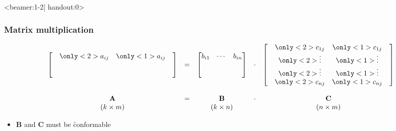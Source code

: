 \begin{frame}<beamer:1-2| handout:0>
  \frametitle{Matrix multiplication}

  \ungap
  \[
  \begin{array}{ccccc}
    \begin{bmatrix}
      & \only<2>{a_{ij}} & \only<1>{a_{ij}} & \\
      & & & \\
      & & &
    \end{bmatrix}
    & = &
    \begin{bmatrix}
      b_{i1} & \cdots & b_{in} \\
      & &  \\
      & &  
    \end{bmatrix}
    & \cdot &
    \begin{bmatrix}
      & \only<2>{c_{1j}} & \only<1>{c_{1j}} &\\
      & \only<2>{\vdots} & \only<1>{\vdots} & \\
      & \only<2>{\vdots} & \only<1>{\vdots} & \\
      & \only<2>{c_{nj}} & \only<1>{c_{nj}} & 
    \end{bmatrix} \\
    \\
    \mathbf{A} & = & \mathbf{B} & \cdot & \mathbf{C} \\
    (k\times m) & & (k\times n) & & (n\times m)
  \end{array}
  \]
  \begin{itemize}
  \item $\mathbf{B}$ and $\mathbf{C}$ must be \h{conformable}%
  \end{itemize}
\end{frame}

